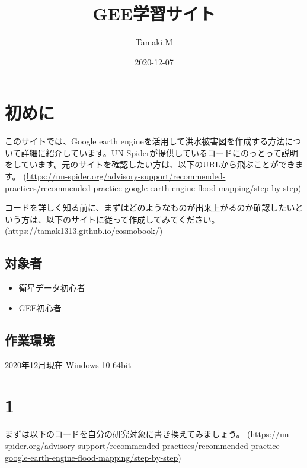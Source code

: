 \documentclass[
]{book}
\title{GEE学習サイト}
\author{Tamaki.M}
\date{2020-12-07}
\begin{document}
\maketitle

{
\setcounter{tocdepth}{1}
\tableofcontents
}
\hypertarget{ux521dux3081ux306b}{%
\chapter*{初めに}\label{ux521dux3081ux306b}}

このサイトでは、Google earth engineを活用して洪水被害図を作成する方法について詳細に紹介しています。UN Spiderが提供しているコードにのっとって説明をしています。元のサイトを確認したい方は、以下のURLから飛ぶことができます。
(\url{https://un-spider.org/advisory-support/recommended-practices/recommended-practice-google-earth-engine-flood-mapping/step-by-step})

コードを詳しく知る前に、まずはどのようなものが出来上がるのか確認したいという方は、以下のサイトに従って作成してみてください。
(\url{https://tamak1313.github.io/cosmobook/})

\hypertarget{ux5bfeux8c61ux8005}{%
\section{対象者}\label{ux5bfeux8c61ux8005}}

\begin{itemize}
\item
  衛星データ初心者
\item
  GEE初心者
\end{itemize}

\hypertarget{ux4f5cux696dux74b0ux5883}{%
\section{作業環境}\label{ux4f5cux696dux74b0ux5883}}

2020年12月現在
Windows 10 64bit

\hypertarget{section}{%
\chapter{1}\label{section}}

まずは以下のコードを自分の研究対象に書き換えてみましょう。
(\url{https://un-spider.org/advisory-support/recommended-practices/recommended-practice-google-earth-engine-flood-mapping/step-by-step})
\end{document}
